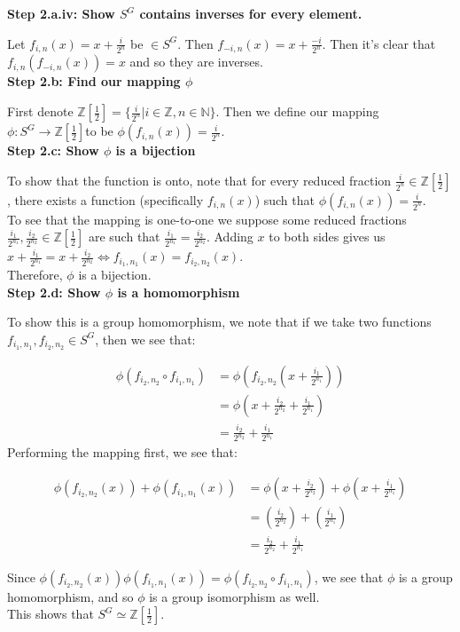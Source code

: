\documentclass[12pt]{article}%
\newcommand{\N}{\mathbb{N}}
\newcommand{\Z}{\mathbb{Z}}
\begin{document}
\textbf{Step 2.a.iv: Show $S^G$ contains inverses for every element.}

Let $f_{i,n}(x)=x+\frac{i}{2^n}$ be $\in S^G$.  Then $f_{-i,n}(x)=x+\frac{-i}{2^n}$. Then it's clear that
$f_{i,n}(f_{-i,n}(x))=x$ and so they are inverses. \\

\textbf{Step 2.b: Find our mapping $\phi$}

First denote $\Z\left[\frac{1}{2}\right]=\{ \frac{i}{2^n} | i \in \Z, n \in \N \}$. Then we define our
mapping $\phi:S^G \rightarrow \Z\left[\frac{1}{2}\right]$to be $\phi(f_{i,n}(x))=\frac{i}{2^n}$. \\

\textbf{Step 2.c: Show $\phi$ is a bijection}

To show that the function is onto, note that for every reduced fraction
$\frac{i}{2^n} \in \Z[\frac{1}{2}]$, there exists a function (specifically $f_{i,n}(x)$) such that
$\phi(f_{i,n}(x))=\frac{i}{2^n}$. \\

To see that the mapping is one-to-one we suppose some reduced fractions
$\frac{i_{1}}{2^{n_1}}, \frac{i_{2}}{2^{n_2}} \in \Z[\frac{1}{2}]$ are such that
$\frac{i_{1}}{2^{n_1}} = \frac{i_{2}}{2^{n_2}}$. Adding $x$ to both sides gives us 
$x+\frac{i_{1}}{2^{n_{1}}}=x+\frac{i_{2}}{2^{n_{2}}}\Leftrightarrow f_{i_{1},n_{1}}(x)=f_{i_{2},n_{2}}(x)$. \\

Therefore, $\phi$ is a bijection. \\

\textbf{Step 2.d: Show $\phi$ is a homomorphism}

To show this is a group homomorphism, we note that if we take two functions
$f_{i_{1},n_{1}}, f_{i_{2},n_{2}} \in S^G$, then we see that:

\begin{align*}
\phi\left(f_{i_{2},n_{2}} \circ f_{i_{1},n_{1}}\right)
&=\phi \left(f_{i_{2},n_{2}}\left(x+\frac{i_{1}}{2^{n_1}}\right)\right) \\
&=\phi\left(x+\frac{i_{2}}{2^{n_2}}+\frac{i_{1}}{2^{n_1}}\right) \\
&=\frac{i_{2}}{2^{n_2}}+\frac{i_{1}}{2^{n_1}}
\end{align*}
Performing the mapping first, we see that:

\begin{align*}
\phi\left(f_{i_{2},n_{2}}(x)\right)+\phi\left(f_{i_{1},n_{1}}(x)\right)
&=\phi \left(x+\frac{i_{2}}{2^{n_2}}\right)+\phi \left(x+\frac{i_{1}}{2^{n_1}}\right) \\
&=\left(\frac{i_{2}}{2^{n_2}}\right) + \left(\frac{i_{1}}{2^{n_1}}\right) \\
&=\frac{i_{2}}{2^{n_2}}+\frac{i_{1}}{2^{n_1}}
\end{align*}

Since $\phi\left(f_{i_{2},n_{2}}(x)\right)\phi\left(f_{i_{1},n_{1}}(x)\right)=\phi\left(f_{i_{2},n_{2}} \circ f_{i_{1},n_{1}}\right)$,
we see that $\phi$ is a group homomorphism, and so $\phi$ is a group isomorphism as well. \\

This shows that $S^G\simeq \Z\left[\frac{1}{2}\right]$.
\end{document}
